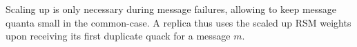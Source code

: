 
%
%
%
Scaling up  is only necessary during message failures, allowing to keep message quanta small in the common-case. A replica thus uses the scaled up RSM weights upon receiving its first duplicate quack for a message $m$. 



